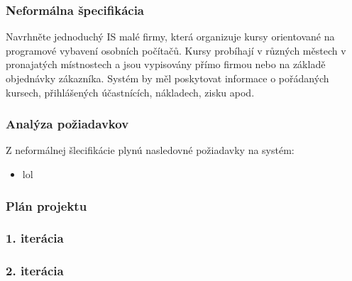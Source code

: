 \documentclass[12pt,a4paper,titlepage,final]{report}
\begin{document}
	\def\authora{Michal Riša}
	\def\authorb{Pavel Macenauer}
	\def\emaila{xrisam01@stud.fit.vutbr.cz}
	\def\emailb{xmacen02@stud.fit.vutbr.cz}
	\def\docname{Firma2}
	\def\projname{Prvotná analýza a plán projektu}
	
	\newpage
	\pagestyle{plain}
	\setcounter{page}{1}
	\subsubsection{Neformálna špecifikácia}
Navrhněte jednoduchý IS malé firmy, která organizuje kursy orientované na programové vybavení osobních počítačů. Kursy probíhají v různých městech v pronajatých místnostech a jsou vypisovány přímo firmou nebo na základě objednávky zákazníka. Systém by měl poskytovat informace o pořádaných kursech, přihlášených účastnících, nákladech, zisku apod.
	\subsubsection{Analýza požiadavkov}
Z neformálnej šlecifikácie plynú nasledovné požiadavky na systém:
		\begin{itemize}
			\item lol
		\end{itemize}
	\subsubsection{Plán projektu}
	\subsubsection{1. iterácia}
	\subsubsection{2. iterácia}
\end{document}
